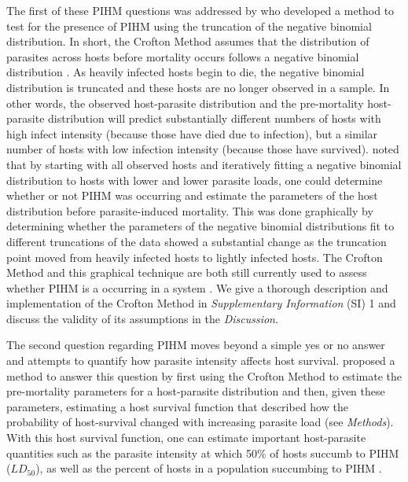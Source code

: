 \documentclass[12pt, a4paper]{article}
\begin{document}
The first of these PIHM questions was addressed by \cite{Crofton1971a} who developed
a method to test for the presence of PIHM using the truncation of the negative binomial
distribution.  In short, the Crofton Method assumes that the distribution of
parasites across hosts before mortality occurs follows a negative binomial
distribution \citep{AndersonandMay1978,Shaw1998}.  As heavily infected hosts
begin to die, the negative binomial distribution is truncated and these hosts are no longer observed in a sample. In other words, the
observed host-parasite distribution and the pre-mortality host-parasite
distribution will predict substantially different numbers of hosts with high infect intensity (because those have died due to infection), but a similar number of hosts with low infection
intensity (because those have survived).  \cite{Crofton1971a} noted that by
starting with all observed hosts and iteratively fitting a negative binomial
distribution to hosts with lower and lower parasite loads, one could determine
whether or not PIHM was occurring and estimate the parameters of the host distribution before parasite-induced mortality.  This was done
graphically by determining whether the parameters of the negative binomial distributions fit to different truncations of the data showed a substantial change as the truncation point moved from heavily infected hosts to lightly infected hosts.  The Crofton Method and this graphical technique are both still currently used to assess whether PIHM is a occurring in a system \citep{Ferguson2011}. We give a thorough description and implementation of the Crofton Method in \emph{Supplementary Information} (SI) 1 and discuss the validity of its assumptions in the \emph{Discussion}.

The second question regarding PIHM moves beyond a simple yes or no answer and attempts to quantify how parasite intensity affects host survival. \cite{Adjei1986} proposed a method to answer this question
by first using the Crofton Method to estimate the pre-mortality parameters for
a host-parasite distribution and then, given these
parameters, estimating a host survival function that described how the
probability of host-survival changed with increasing parasite load (see
\emph{Methods}).  With this host survival function, one can estimate important host-parasite quantities such as the
parasite intensity at which 50\% of hosts succumb to PIHM ($LD_{50}$), as well
as the percent of hosts in a population succumbing to PIHM \citep{Adjei1986}.
\end{document}
